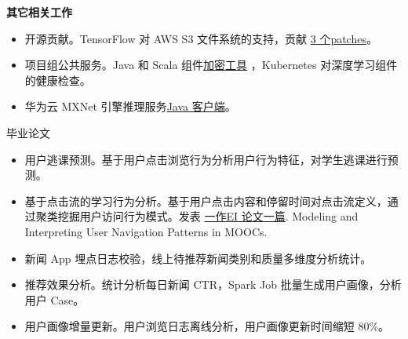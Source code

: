 \documentclass{resume}
\begin{document}
\begin{onehalfspacing}
\textbf{其它相关工作}  
\begin{itemize}%
  \item 开源贡献。TensorFlow 对 AWS S3 文件系统的支持，贡献 \href{https://github.com/tensorflow/tensorflow/pull/11089#issuecomment-320258536}{3 个patches}。
  \item 项目组公共服务。Java 和 Scala 组件\href{https://github.com/neuzxy/AESCryptTools}{加密工具} ，Kubernetes 对深度学习组件的健康检查。 
  \item 华为云 MXNet 引擎推理服务\href{https://github.com/huawei-clouds/dls-mxserving-client/tree/master/java}{Java 客户端}。
\end{itemize}
\end{onehalfspacing}

 {毕业论文}
\begin{itemize}[parsep=0.5ex]
  \item 用户逃课预测。基于用户点击浏览行为分析用户行为特征，对学生逃课进行预测。
  \item 基于点击流的学习行为分析。基于用户点击内容和停留时间对点击流定义，通过聚类挖掘用户访问行为模式。发表 \href{http://storage.cparty.co/user/02ct718cKf/activity/20161229092844J3VFZT9Q/publishnews/attachment_20170705055506001499234106971251_file}{一作EI 论文一篇}. Modeling and Interpreting User Navigation Patterns in MOOCs.
\end{itemize}


\begin{itemize}[parsep=0.5ex]
  \item 新闻 App 埋点日志校验，线上待推荐新闻类别和质量多维度分析统计。
  \item 推荐效果分析。统计分析每日新闻 CTR，Spark Job 批量生成用户画像，分析用户 Case。
  \item 用户画像增量更新。用户浏览日志离线分析，用户画像更新时间缩短 80\%。
\end{itemize}

\end{document}
